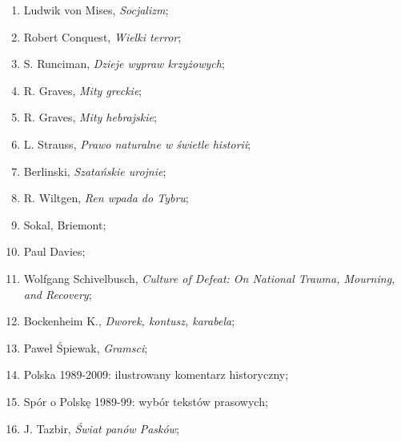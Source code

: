 \documentclass[a4paper,11pt]{article}
\begin{document}
\begin{enumerate}
\item Ludwik von Mises, \textit{Socjalizm};



\item Robert Conquest, \textit{Wielki terror};



\item S. Runciman, \textit{Dzieje wypraw krzyżowych};



\item R. Graves, \textit{Mity greckie};



\item R. Graves, \textit{Mity hebrajskie};



\item L. Strauss, \textit{Prawo naturalne w świetle historii};



\item Berlinski, \textit{Szatańskie urojnie};



\item R. Wiltgen, \textit{Ren wpada do Tybru};



\item Sokal, Briemont;



\item Paul Davies;



\item Wolfgang Schivelbusch, \textit{Culture of Defeat: On National
    Trauma, Mourning, and Recovery};



\item Bockenheim K., \textit{Dworek, kontusz, karabela};



\item Paweł Śpiewak, \textit{Gramsci};



\item Polska 1989-2009: ilustrowany komentarz historyczny;



\item Spór o Polskę 1989-99: wybór tekstów prasowych;



\item J. Tazbir, \textit{Świat panów Pasków};




\end{enumerate}
\end{document}
